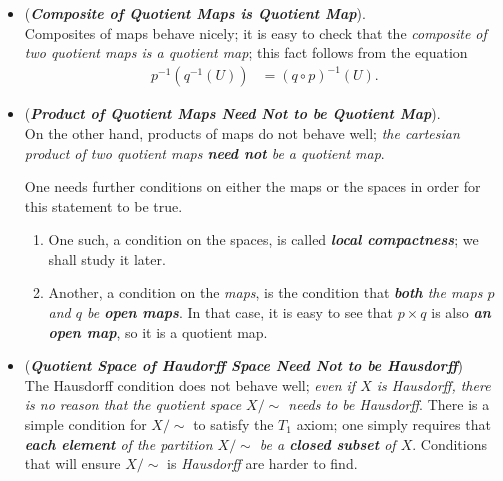 \documentclass[11pt]{article}
\begin{document}
\begin{itemize}
\item \begin{remark} (\textbf{\emph{Composite of Quotient Maps is Quotient Map}}). \\
Composites of maps  behave nicely; it is easy to check that the \emph{composite of two quotient maps is a quotient map}; this fact follows from the equation
\begin{align*}
p^{-1}(q^{-1}(U)) &= (q\circ p)^{-1}(U).
\end{align*}
\end{remark}

\item \begin{remark} (\textbf{\emph{Product of Quotient Maps Need Not to be Quotient Map}}). \\
On the other hand, products of maps do not behave well; \emph{the cartesian product of two quotient maps \textbf{need not} be a quotient map}. 

One needs further conditions on either the maps or the spaces in order for this statement to be true. 
\begin{enumerate}
\item One such, a condition on the spaces, is called \emph{\textbf{local compactness}}; we shall study it later. 
\item Another, a condition on the \emph{maps}, is the condition that \emph{\textbf{both} the maps $p$ and $q$ be \textbf{open maps}}. In that case, it is easy to see that $p \times q$ is also \emph{\textbf{an open map}}, so it is a quotient map.
\end{enumerate}
\end{remark}

\item \begin{remark} (\emph{\textbf{Quotient Space of Haudorff Space Need Not to be Hausdorff}})\\
The Hausdorff condition does not behave well; \emph{even if $X$ is Hausdorff, there is no reason that the quotient space $X/\sim$ needs to be Hausdorff}. There is a simple condition for $X/\sim$ to satisfy the $T_1$ axiom; one simply requires that \emph{\textbf{each element} of the partition $X/\sim$ be a \textbf{closed subset} of $X$}. Conditions that will ensure $X/\sim$ is \emph{Hausdorff} are harder to find.
\end{remark}
\end{itemize}
\end{document}
